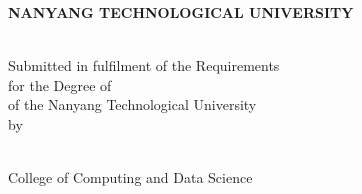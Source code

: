 \makeatletter
\begin{titlepage}
\begin{center}

\uppercase{\textbf{\large{Nanyang Technological University}}}
\\[6cm]

\uppercase{\textbf{\fypcode \\[0.3cm]\@title}}

\vfill

Submitted in fulfilment of the Requirements\\
for the Degree of \degree\\
of the Nanyang Technological University
\\[0.8cm]
by
\\[0.8cm]

\@author
\\[2cm]

\end{center}

College of Computing and Data Science\\
\@date
\end{titlepage}
\makeatother